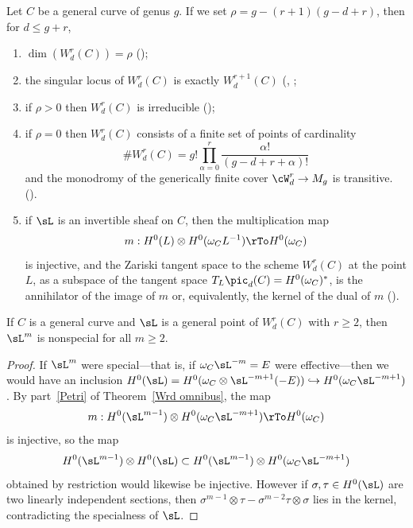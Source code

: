 \begin{theorem}\label{Wrd omnibus}
Let $C$ be a general curve of genus $g$. If we set $\rho = g - (r+1)(g-d+r)$, then for $d \leq g+r$,
\begin{enumerate}

\item $\dim(W^r_d(C)) = \rho$ (\cite{Griffiths-Harris-BN});\label{GH}

\item\label{sing wrd} the singular locus of $W^r_d(C)$ is exactly $W^{r+1}_d(C)$
(\cite{Gieseker-Petri}, \cite{Lazarsfeld-Petri};
\label{irr wrd} 

\item if $\rho > 0$ then $W^r_d(C)$ is irreducible (\cite{MR611386});

\item\label{rho=0} if $\rho = 0$ then $W^r_d(C)$ consists of a finite set of  points of cardinality
$$
\#W^r_d(C) = g! \prod_{\alpha=0}^r \frac{\alpha!}{(g-d+r+\alpha)!}
$$
and the monodromy of the generically finite cover $\cW^r_d \to M_g$ is transitive.
(\cite{zbMATH04014883}).

\item\label{Petri} if  $\sL$ is an invertible sheaf on $C$, then the multiplication map
$$
m : H^0(L) \otimes H^0(\omega_CL^{-1}) \rTo H^0(\omega_C)
$$
is injective, and the Zariski tangent space to the scheme $W^r_d(C)$ at the point $L$, as a subspace
of the tangent space $T_L\pic_d(C) = H^0(\omega_C)^*$, is the annihilator of the image of $m$
or, equivalently, the kernel of the dual of $m$ (\cite{Gieseker-Petri}).
\end{enumerate}
\end{theorem}


\begin{corollary}\label{2L nonspecial}
If $C$ is a general curve and $\sL$ is a general point of $W^r_d(C)$ with $r\geq 2$,
 then $\sL^m$ is nonspecial for all $m \geq 2$.
\end{corollary}

\begin{proof}
If $\sL^m$ were special---that is, if $\omega_C\sL^{-m} = E$ were effective---then we would have an inclusion $H^0(\sL) = H^0(\omega_C\otimes \sL^{-m+1}(-E)) \hookrightarrow H^0(\omega_C\sL^{-m+1})$. By part~\ref{Petri} of Theorem~\ref{Wrd omnibus}, the map 
 $$
m : H^0(\sL^{m-1}) \otimes H^0(\omega_C\sL^{-m+1}) \rTo H^0(\omega_C)
$$
is injective, so the map
$$
H^0(\sL^{m-1}) \otimes H^0(\sL) \subset H^0(\sL^{m-1}) \otimes H^0(\omega_C\sL^{-m+1})
$$
obtained by restriction would likewise be injective.
However if $\sigma, \tau \in H^0(\sL)$ are two linearly independent sections, then $\sigma^{m-1} \otimes \tau - \sigma^{m-2}\tau \otimes \sigma$ lies in the kernel, contradicting the specialness of $\sL$.
\end{proof}

